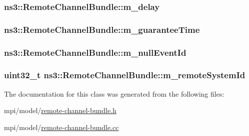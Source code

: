 \subsubsection[{\texorpdfstring{m\+\_\+delay}{m_delay}}]{ ns3\+::\+Remote\+Channel\+Bundle\+::m\+\_\+delay\hspace{0.3cm}{\ttfamily [private]}}\hypertarget{classns3_1_1RemoteChannelBundle_a18a05fe3b0c6e58618b261c148d47031}{}\label{classns3_1_1RemoteChannelBundle_a18a05fe3b0c6e58618b261c148d47031}
\subsubsection[{\texorpdfstring{m\+\_\+guarantee\+Time}{m_guaranteeTime}}]{ ns3\+::\+Remote\+Channel\+Bundle\+::m\+\_\+guarantee\+Time\hspace{0.3cm}{\ttfamily [private]}}\hypertarget{classns3_1_1RemoteChannelBundle_acd2adaa59c29d3a4bf94dba13a563ebf}{}\label{classns3_1_1RemoteChannelBundle_acd2adaa59c29d3a4bf94dba13a563ebf}
\subsubsection[{\texorpdfstring{m\+\_\+null\+Event\+Id}{m_nullEventId}}]{ ns3\+::\+Remote\+Channel\+Bundle\+::m\+\_\+null\+Event\+Id\hspace{0.3cm}{\ttfamily [private]}}\hypertarget{classns3_1_1RemoteChannelBundle_af7a9da03ea61b30c0d8e30ed874c4b88}{}\label{classns3_1_1RemoteChannelBundle_af7a9da03ea61b30c0d8e30ed874c4b88}
\subsubsection[{\texorpdfstring{m\+\_\+remote\+System\+Id}{m_remoteSystemId}}]{\setlength{\rightskip}{0pt plus 5cm}uint32\+\_\+t ns3\+::\+Remote\+Channel\+Bundle\+::m\+\_\+remote\+System\+Id\hspace{0.3cm}{\ttfamily [private]}}\hypertarget{classns3_1_1RemoteChannelBundle_ae00de088286f8301c85a3becc766d5a7}{}\label{classns3_1_1RemoteChannelBundle_ae00de088286f8301c85a3becc766d5a7}


The documentation for this class was generated from the following files\+:\begin{DoxyCompactItemize}
\item 
mpi/model/\hyperlink{remote-channel-bundle_8h}{remote-\/channel-\/bundle.\+h}\item 
mpi/model/\hyperlink{remote-channel-bundle_8cc}{remote-\/channel-\/bundle.\+cc}\end{DoxyCompactItemize}
